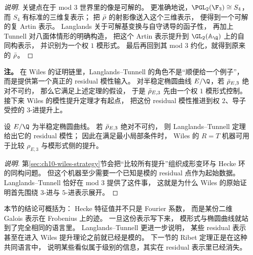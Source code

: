 \begin{proof}[说明]
关键点在于 mod $3$ 世界里的像是可解的。
更准确地说，$\PGL_2(\F_3)\cong S_4$，
而 $S_4$ 有标准的三维复表示；
把 $\bar{\rho}$ 的射影像送入这个三维表示，
便得到一个可解的复 Artin 表示。
Langlands 关于可解基变换与自守诱导的函子性，
再加上 Tunnell 对八面体情形的明确构造，
把这个 Artin 表示提升到 $\GL_2(\mathbb A_\Q)$ 上的自同构表示，
并识别为一个权 $1$ 模形式。
最后再回到其 mod $3$ 约化，就得到原来的 $\bar{\rho}$。
\end{proof}

\textbf{注。}
在 Wiles 的证明链里，Langlands--Tunnell 的角色不是“顺便给一个例子”，
而是提供第一个真正的 residual 模性输入。
对半稳定椭圆曲线 $E/\Q$，若 $\bar{\rho}_{E,3}$ 绝对不可约，
那么它满足上述定理的假设，
于是 $\bar{\rho}_{E,3}$ 先由一个权 $1$ 模形式控制。
接下来 Wiles 的模性提升定理才有起点，
把这份 residual 模性推进到权 $2$、导子受控的 $3$-进提升上。

\begin{proposition}
\label{prop:ch09-lt-starts-wiles}
设 $E/\Q$ 为半稳定椭圆曲线。
若 $\bar{\rho}_{E,3}$ 绝对不可约，
则 Langlands--Tunnell 定理给出它的 residual 模性；
因此在满足最小局部条件时，
Wiles 的 $R=T$ 机器可用于比较 $\rho_{E,3}$ 与模形式侧的提升。
\end{proposition}

\begin{proof}[说明]
第\ref{sec:ch10-wiles-strategy}节会把“比较所有提升”组织成形变环与 Hecke 环的同构问题。
但这个机器至少需要一个已知是模的 residual 点作为起始数据。
Langlands--Tunnell 恰好在 mod $3$ 提供了这件事，
这就是为什么 Wiles 的原始证明首先围绕 $3$-进与 $5$-进表示展开。
\end{proof}

本节的结论可概括为：
Hecke 特征值并不只是 Fourier 系数，
而是某份二维 Galois 表示在 Frobenius 上的迹。
一旦这份表示写下来，
模形式与椭圆曲线就站到了完全相同的语言里。
Langlands--Tunnell 更进一步说明，
某些 residual 表示甚至在进入 Wiles 提升理论之前就已经是模的。
下一节的 Ribet 定理正是在这种共同语言中，
说明某些看似属于级别的信息，其实在 residual 表示里已经消失。 
